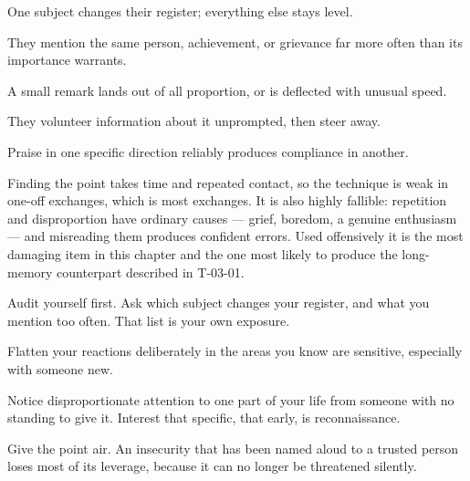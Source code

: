 \begin{feedback}
  \item One subject changes their register; everything else stays level.
  \item They mention the same person, achievement, or grievance far more often than its importance warrants.
  \item A small remark lands out of all proportion, or is deflected with unusual speed.
  \item They volunteer information about it unprompted, then steer away.
  \item Praise in one specific direction reliably produces compliance in another.
\end{feedback}

\begin{failure}
Finding the point takes time and repeated contact, so the technique is weak in one-off exchanges, which is most exchanges. It is also highly fallible: repetition and disproportion have ordinary causes --- grief, boredom, a genuine enthusiasm --- and misreading them produces confident errors. Used offensively it is the most damaging item in this chapter and the one most likely to produce the long-memory counterpart described in T-03-01.
\end{failure}

\begin{countermeasures}
  \item Audit yourself first. Ask which subject changes your register, and what you mention too often. That list is your own exposure.
  \item Flatten your reactions deliberately in the areas you know are sensitive, especially with someone new.
  \item Notice disproportionate attention to one part of your life from someone with no standing to give it. Interest that specific, that early, is reconnaissance.
  \item Give the point air. An insecurity that has been named aloud to a trusted person loses most of its leverage, because it can no longer be threatened silently.
\end{countermeasures}

\seesources
{}
